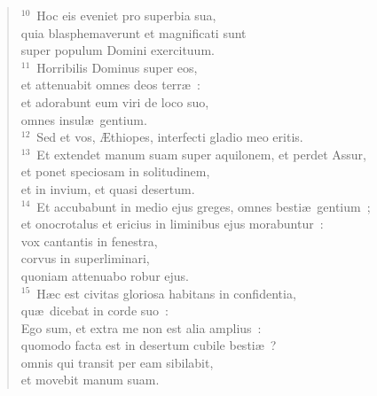 \begin{verse}
${}^{10}$~Hoc eis eveniet pro superbia sua,\\ quia blasphemaverunt et magnificati sunt\\ super populum Domini exercituum.\\
${}^{11}$~Horribilis Dominus super eos,\\ et attenuabit omnes deos terr\ae~:\\ et adorabunt eum viri de loco suo,\\ omnes insul\ae\ gentium.\\
${}^{12}$~Sed et vos, \AE thiopes, interfecti gladio meo eritis.\\
${}^{13}$~Et extendet manum suam super aquilonem, et perdet Assur,\\ et ponet speciosam in solitudinem,\\ et in invium, et quasi desertum.\\
${}^{14}$~Et accubabunt in medio ejus greges, omnes besti\ae\ gentium~;\\ et onocrotalus et ericius in liminibus ejus morabuntur~:\\ vox cantantis in fenestra,\\ corvus in superliminari,\\ quoniam attenuabo robur ejus.\\
${}^{15}$~H\ae c est civitas gloriosa habitans in confidentia,\\ qu\ae\ dicebat in corde suo~:\\ Ego sum, et extra me non est alia amplius~:\\ quomodo facta est in desertum cubile besti\ae~?\\ omnis qui transit per eam sibilabit,\\ et movebit manum suam.\end{verse}


